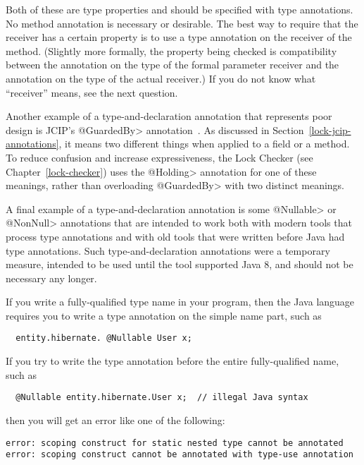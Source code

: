 Both of these are type properties and should be specified with type
annotations.  No method annotation is necessary or desirable.  The best way
to require that the receiver has a certain property is to use a type
annotation on the receiver of the method.  (Slightly more formally, the
property being checked is compatibility between the annotation on the type
of the formal parameter receiver and the annotation on the type of the
actual receiver.)  If you do not know what ``receiver'' means, see the next
question.


Another example of a type-and-declaration annotation that represents poor
design is JCIP's \<@GuardedBy> annotation~\cite{Goetz2006}.  As discussed
in Section~\ref{lock-jcip-annotations}, it means two different things when
applied to a field or a method.  To reduce confusion and increase
expressiveness, the Lock Checker (see Chapter~\ref{lock-checker}) uses the
\<@Holding> annotation for one of these meanings, rather than overloading
\<@GuardedBy> with two distinct meanings.


A final example of a type-and-declaration annotation is some \<@Nullable>
or \<@NonNull> annotations that are intended to work both with modern tools
that process type annotations and with old tools that were written before
Java had type annotations.  Such type-and-declaration annotations were a
temporary measure, intended to be used until the tool supported Java 8, and
should not be necessary any longer.



If you write a fully-qualified type name in your program, then the Java
language requires you to write a type annotation on the simple name part,
such as
\begin{Verbatim}
  entity.hibernate. @Nullable User x;
\end{Verbatim}

If you try to write the type annotation before the entire fully-qualified
name, such as
\begin{Verbatim}
  @Nullable entity.hibernate.User x;  // illegal Java syntax
\end{Verbatim}
\noindent
then you will get an error like one of the following:
\begin{Verbatim}
error: scoping construct for static nested type cannot be annotated
error: scoping construct cannot be annotated with type-use annotation
\end{Verbatim}


